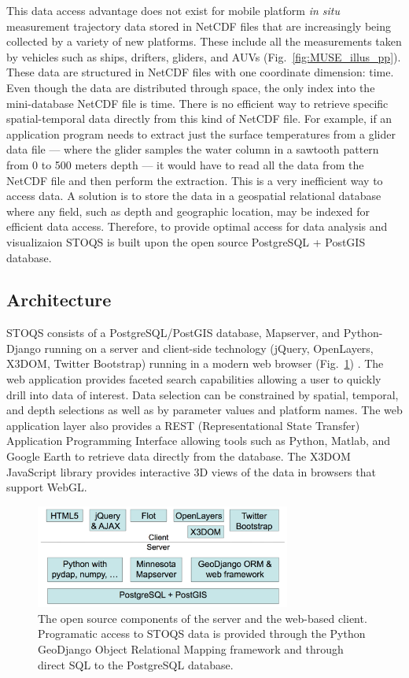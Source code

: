 \documentclass[conference]{IEEEtran}
\begin{document}
This data access advantage does not exist for mobile platform \textit{in situ} measurement trajectory data stored in NetCDF files that are increasingly being collected by a variety of new platforms. These include all the measurements taken by vehicles such as ships, drifters, gliders, and AUVs (Fig.~\ref{fig:MUSE_illus_pp}). These data are structured in NetCDF files with one coordinate dimension: time. Even though the data are distributed through space, the only index into the mini-database NetCDF file is time. There is no efficient way to retrieve specific spatial-temporal data directly from this kind of NetCDF file. For example, if an application program needs to extract just the surface temperatures from a glider data file --- where the glider samples the water column in a sawtooth pattern from 0 to 500 meters depth --- it would have to read all the data from the NetCDF file and then perform the extraction. This is a very inefficient way to access data. A solution is to store the data in a geospatial relational database where any field, such as depth and geographic location,  may be indexed for efficient data access. Therefore, to provide optimal access for data analysis and visualizaion STOQS is built upon the open source PostgreSQL + PostGIS database.



\subsection{Architecture}

STOQS consists of a PostgreSQL/PostGIS database, Mapserver, and Python-Django running on a server and client-side technology (jQuery, OpenLayers, X3DOM, Twitter Bootstrap) running in a modern web browser (Fig.~\ref{fig:STOQSArch}) . The web application provides faceted search capabilities allowing a user to quickly drill into data of interest. Data selection can be constrained by spatial, temporal, and depth selections as well as by parameter values and platform names. The web application layer also provides a REST (Representational State Transfer) Application Programming Interface allowing tools such as Python, Matlab, and Google Earth to retrieve data directly from the database. The X3DOM JavaScript library provides interactive 3D views of the data in browsers that support WebGL.

\begin{figure}[htbp]
\centering
\includegraphics[width=3.3in]{stoqs_arch_simple.png}
\caption{The open source components of the server and the web-based client. Programatic access to STOQS data is provided through the Python GeoDjango Object Relational Mapping framework and through direct SQL to the PostgreSQL database.}
\label{fig:STOQSArch}
\end{figure}
\end{document}

